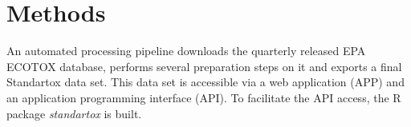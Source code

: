 \section*{Methods}
An automated processing pipeline downloads the quarterly released EPA ECOTOX database, performs several preparation steps on it and exports a final Standartox data set. This data set is accessible via a web application (APP) and an application programming interface (API). To facilitate the API access, the R \citep{rcoreteam_language_2017} package \textit{standartox} is built.

